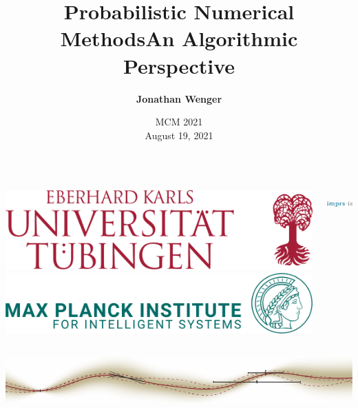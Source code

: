 \documentclass[10pt,usepdftitle=false,aspectratio=169]{beamer}
\begin{document}
\begin{frame}
	\vspace{.5cm}
	\title{
		{\bf Probabilistic Numerical Methods}\newline An Algorithmic Perspective
		\vspace*{-.7cm}}
	\author{\bf Jonathan Wenger\vspace{-1cm}} \date{MCM 2021\\ August 19, 2021}

	\maketitle

	\begin{columns}
		\includegraphics[width=\textwidth]{assets/UT_WBMW_Rot_RGB.pdf}
		\includegraphics[width=.9\textwidth]{assets/MPI-IS_wortbildmarke.png}\\
		\parbox[c]{.1\textwidth}{\centering\includegraphics[height=1.05cm]{assets/imprs-is-logo.png}}
	\end{columns}

	\thispagestyle{empty}
	\setcounter{framenumber}{0}

	\begin{columns}
		\includegraphics[width=0.9995\paperwidth]{assets/logo_TU_169_0.pdf}
	\end{columns}

\end{frame}
\end{document}

